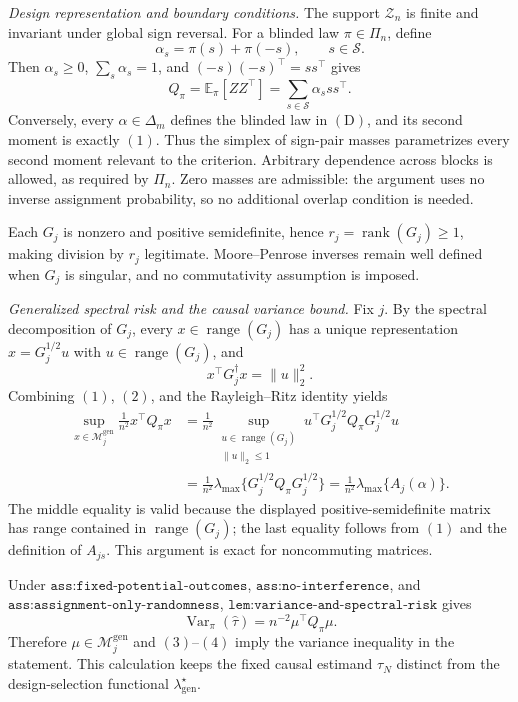 \textit{Design representation and boundary conditions.}
The support \(\mathcal Z_n\) is finite and invariant under global sign reversal. For a blinded law \(\pi\in\Pi_n\), define
\[
\alpha_s=\pi(s)+\pi(-s),\qquad s\in\mathscr S.
\]
Then \(\alpha_s\ge0\), \(\sum_s\alpha_s=1\), and \((-s)(-s)^\top=ss^\top\) gives
\[
Q_\pi=\mathbb E_\pi[ZZ^\top]
=\sum_{s\in\mathscr S}\alpha_sss^\top.
\tag{1}
\]
Conversely, every \(\alpha\in\Delta_m\) defines the blinded law in \((\mathrm D)\), and its second moment is exactly \((1)\). Thus the simplex of sign-pair masses parametrizes every second moment relevant to the criterion. Arbitrary dependence across blocks is allowed, as required by \(\Pi_n\). Zero masses are admissible: the argument uses no inverse assignment probability, so no additional overlap condition is needed.

Each \(G_j\) is nonzero and positive semidefinite, hence \(r_j=\operatorname{rank}(G_j)\ge1\), making division by \(r_j\) legitimate. Moore--Penrose inverses remain well defined when \(G_j\) is singular, and no commutativity assumption is imposed.

\textit{Generalized spectral risk and the causal variance bound.}
Fix \(j\). By the spectral decomposition of \(G_j\), every \(x\in\operatorname{range}(G_j)\) has a unique representation \(x=G_j^{1/2}u\) with \(u\in\operatorname{range}(G_j)\), and
\[
x^\top G_j^\dagger x=\lVert u\rVert_2^2.
\tag{2}
\]
Combining \((1)\), \((2)\), and the Rayleigh--Ritz identity yields
\[
\begin{aligned}
\sup_{x\in\mathcal M_j^{\mathrm{gen}}}
\frac1{n^2}x^\top Q_\pi x
&=\frac1{n^2}
\sup_{\substack{u\in\operatorname{range}(G_j)\\\lVert u\rVert_2\le1}}
u^\top G_j^{1/2}Q_\pi G_j^{1/2}u\\
&=\frac1{n^2}\lambda_{\max}
\{G_j^{1/2}Q_\pi G_j^{1/2}\}
=\frac1{n^2}\lambda_{\max}\{A_j(\alpha)\}.
\end{aligned}
\tag{3}
\]
The middle equality is valid because the displayed positive-semidefinite matrix has range contained in \(\operatorname{range}(G_j)\); the last equality follows from \((1)\) and the definition of \(A_{js}\). This argument is exact for noncommuting matrices.

Under \(\texttt{ass:fixed-potential-outcomes}\), \(\texttt{ass:no-interference}\), and \(\texttt{ass:assignment-only-randomness}\), \(\texttt{lem:variance-and-spectral-risk}\) gives
\[
\operatorname{Var}_\pi(\widehat\tau)
=n^{-2}\mu^\top Q_\pi\mu.
\tag{4}
\]
Therefore \(\mu\in\mathcal M_j^{\mathrm{gen}}\) and \((3)\)--\((4)\) imply the variance inequality in the statement. This calculation keeps the fixed causal estimand \(\tau_N\) distinct from the design-selection functional \(\lambda_{\mathrm{gen}}^\star\).


